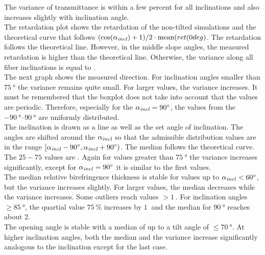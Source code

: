 The variance of transmittance is within a few percent for all inclinations and also increases slightly with inclination angle.
\\
% 
The retardation plot shows the retardation of the non-tilted simulations and the theoretical curve that follows $(\cos(\textnormal{$\alpha_{\mathit{incl}}$}) + 1) / 2 \cdot \mathrm{mean}(ret(0 deg)$.
The retardation follows the theoretical line.
However, in the middle slope angles, the measured retardation is higher than the theoretical line.
Otherwise, the variance along all fiber inclinations is equal to \modelInc{}.
\\
% 
The next graph shows the measured direction.
For inclination angles smaller than $\SI{75}{\degree}$ the variance remains quite small.
For larger values, the variance increases.
It must be remembered that the boxplot does not take into account that the values are periodic.
Therefore, especially for the $\textnormal{$\alpha_{\mathit{incl}}$}=\SI{90}{\degree}$, the values from the $\SIrange{-90}{90}{\degree}$ are uniformly distributed.
\\
% 
The inclination is drawn as a line as well as the set angle of inclination.
The angles are shifted around the $\textnormal{$\alpha_{\mathit{incl}}$}$ so that the admissible distribution values are in the range $[\textnormal{$\alpha_{\mathit{incl}}$}-\SI{90}{\degree}, \textnormal{$\alpha_{\mathit{incl}}$}+\SI{90}{\degree})$.
The median follows the theoretical curve.
The $25-75$ values are \dummy{} .
Again for values greater than $\SI{75}{\degree}$ the variance increases significantly, except for $\textnormal{$\alpha_{\mathit{incl}}$} = \SI{90}{\degree}$ it is similar to the first values.
\\
% 
The median relative birefringence thickness \trel{} is stable for values up to $\textnormal{$\alpha_{\mathit{incl}}$} < \SI{60}{\degree}$, but the variance increases slightly.
For larger values, the median decreases while the variance increases.
Some outliers reach values $>\SI{1}{}$.
For inclination angles $\ge \SI{85}{\degree}$, the quartial value $\SI{75}{\percent}$ increases by $\SI{1}{}$ and the median for $\SI{90}{\degree}$ reaches about 2.
\\
% 
The opening angle is stable with a median of \dummy{} up to a tilt angle of $\le \SI{70}{\degree}$.
At higher inclination angles, both the median and the variance increase significantly analogous to the inclination except for the last case.
% 
% 
% 
